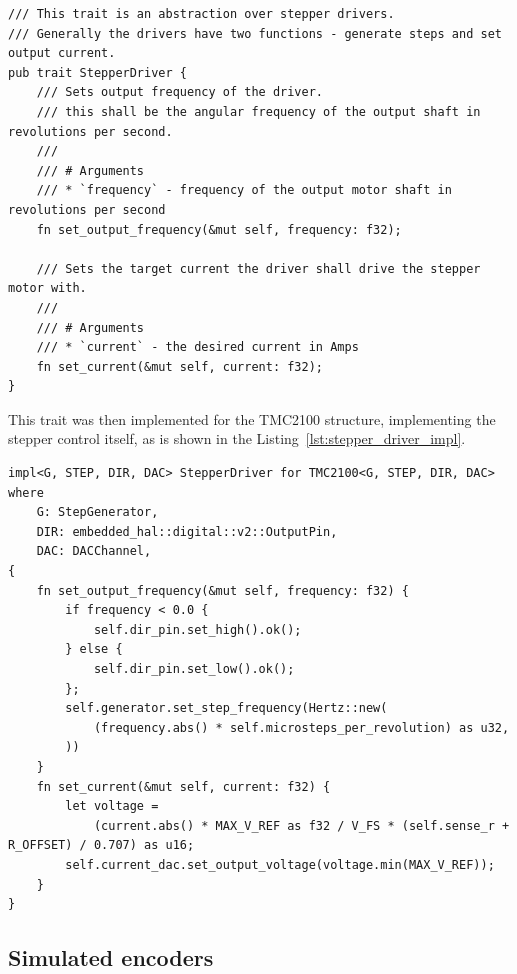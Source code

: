 \begin{lstlisting}[caption={Trait for abstracting the stepper motor driver IC.},label=lst:stepper_driver_trait]
/// This trait is an abstraction over stepper drivers.
/// Generally the drivers have two functions - generate steps and set output current.
pub trait StepperDriver {
    /// Sets output frequency of the driver.
    /// this shall be the angular frequency of the output shaft in revolutions per second.
    ///
    /// # Arguments
    /// * `frequency` - frequency of the output motor shaft in revolutions per second
    fn set_output_frequency(&mut self, frequency: f32);

    /// Sets the target current the driver shall drive the stepper motor with.
    ///
    /// # Arguments
    /// * `current` - the desired current in Amps
    fn set_current(&mut self, current: f32);
}
\end{lstlisting}

This trait was then implemented for the TMC2100 structure, implementing the stepper control itself, as is shown in the Listing~\ref{lst:stepper_driver_impl}.

\begin{lstlisting}[caption={Implementing the StepperDriver trait for TMC2100.},label=lst:stepper_driver_impl]
impl<G, STEP, DIR, DAC> StepperDriver for TMC2100<G, STEP, DIR, DAC>
where
    G: StepGenerator,
    DIR: embedded_hal::digital::v2::OutputPin,
    DAC: DACChannel,
{
    fn set_output_frequency(&mut self, frequency: f32) {
        if frequency < 0.0 {
            self.dir_pin.set_high().ok();
        } else {
            self.dir_pin.set_low().ok();
        };
        self.generator.set_step_frequency(Hertz::new(
            (frequency.abs() * self.microsteps_per_revolution) as u32,
        ))
    }
    fn set_current(&mut self, current: f32) {
        let voltage =
            (current.abs() * MAX_V_REF as f32 / V_FS * (self.sense_r + R_OFFSET) / 0.707) as u16;
        self.current_dac.set_output_voltage(voltage.min(MAX_V_REF));
    }
}
\end{lstlisting}

\subsection{Simulated encoders}
\label{subsec:simulated_encoders}

